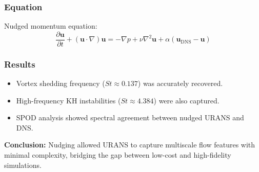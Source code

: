\subsubsection*{Equation}

Nudged momentum equation:
\[
\frac{\partial \mathbf{u}}{\partial t} + (\mathbf{u} \cdot \nabla) \mathbf{u} = -\nabla p + \nu \nabla^2 \mathbf{u} + \alpha (\mathbf{u}_{\text{DNS}} - \mathbf{u})
\]

\subsubsection*{Results}

\begin{itemize}
  \item Vortex shedding frequency ($St \approx 0.137$) was accurately recovered.
  \item High-frequency KH instabilities ($St \approx 4.384$) were also captured.
  \item SPOD analysis showed spectral agreement between nudged URANS and DNS.
\end{itemize}

\textbf{Conclusion:} Nudging allowed URANS to capture multiscale flow features with minimal complexity, bridging the gap between low-cost and high-fidelity simulations.

